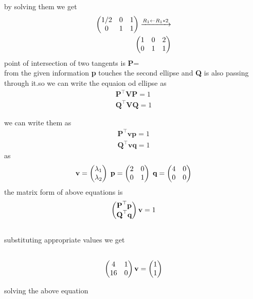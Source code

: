 \begin{center}
\begin{equation}
   \end{equation}  
   by solving them we get
   \begin{align*}
   \begin{pmatrix}1/2&0&1\\0&1&1\end{pmatrix}  \xrightarrow[]{R_1 \leftarrow R_1*2 }
   \\ \begin{pmatrix}1&0&2\\0&1&1\end{pmatrix}
\end{align*}        
point of intersection of two tangents is \textbf{P}=
\\ from the given information  \textbf{p} touches the second ellipse and \textbf{Q} is also passing through it.so we can write the equaion od ellipse as
 \begin{align} 
 \textbf{P}^{\top}\textbf{V}\textbf{P}=1
         \\  \textbf{Q}^{\top}\textbf{V}\textbf{Q}=1 
        \end{align}
              
        we can write them as
       \begin{align} 
          \textbf{P}^{\top}\textbf{v}\textbf{p}=1
          \\ \textbf{Q}^{\top}\textbf{v}\textbf{q}=1 
          \end{align}
          as
          \begin{equation}
          \textbf{v}=\begin{pmatrix}{\lambda}_{1}\\{\lambda}_{2}\end{pmatrix}
          \; \textbf{p}=\begin{pmatrix}2&0\\0&1\end{pmatrix} 
         \; \textbf{q}=\begin{pmatrix}4&0\\0&0\end{pmatrix}
          \end{equation}
          the matrix form of above equations is
          \begin{align} 
            \begin{pmatrix}\textbf{P}^{\top}\textbf{p} \\ \textbf{Q}^{\top}\textbf{q}\end{pmatrix}\textbf{v}=1
           \end{align}
             \\  substituting appropriate values we get
             \begin{align}
              \\\begin{pmatrix}4&1\\16&0\end{pmatrix}\textbf{v}=\begin{pmatrix}1\\1\end{pmatrix}
\end{align}
\end{center}
solving the above equation
